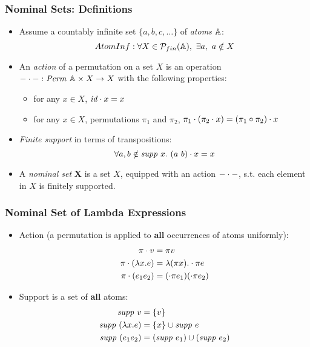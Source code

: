 \documentclass[10pt]{beamer}
\begin{document}
\begin{frame}
  \frametitle{Nominal Sets: Definitions}
  \begin{itemize}
  \item Assume a countably infinite set $\{a,b,c,\dots \}$ of \emph{atoms} $\mathbb{A}$:
    \[ AtomInf : \forall X \in \mathcal{P}_{fin}(\mathbb{A}),~\exists a,~a \notin X\]
  \item An \emph{action} of a permutation on a set $X$ is an operation
    $- \cdot -: \mathit{Perm}~\mathbb{A} \times X -> X$ with the following properties:
    \begin{itemize}
    \item for any $x\in X$, $\mathit{id} \cdot x = x$
    \item for any $x\in X$, permutations $\pi_1$ and $\pi_2$, $\pi_1 \cdot (\pi_2 \cdot x) = (\pi_1 \circ \pi_2) \cdot x$
    \end{itemize}
  \item \emph{Finite support} in terms of transpositions:
    \[ \forall a,b \notin \mathit{supp}~ x.~(a ~ b) \cdot x = x \]
  \item A \emph{nominal set} \textbf{X} is a set $X$, equipped with an action
    $- \cdot -$, s.t. each element in $X$ is finitely supported.
  \end{itemize}
\end{frame}

\begin{frame}
  \frametitle{Nominal Set of Lambda Expressions}
  \begin{itemize}
  \item Action (a permutation is applied to \textbf{all} occurrences of atoms uniformly):
    \begin{align*}
    \action \pi v &= \pi v\\
    \action \pi {(\lambda x.e)} &= \lambda (\pi x). \action \pi e\\
    \action \pi {(e_1 e_2)} &= (\action \pi {e_1}) (\action \pi {e_2})
    \end{align*}
  \item Support is a set of \textbf{all} atoms:
    \begin{align*}
    \mathit{supp}~ v &= \{v\}\\
    \mathit{supp}~ (\lambda x.e) &= \{x\} \cup \mathit{supp}~ e\\
    \mathit{supp}~ (e_1 e_2) & = (\mathit{supp}~ e_1) \cup (\mathit{supp}~ e_2)
  \end{align*}
  \end{itemize}
\end{frame}
\end{document}
